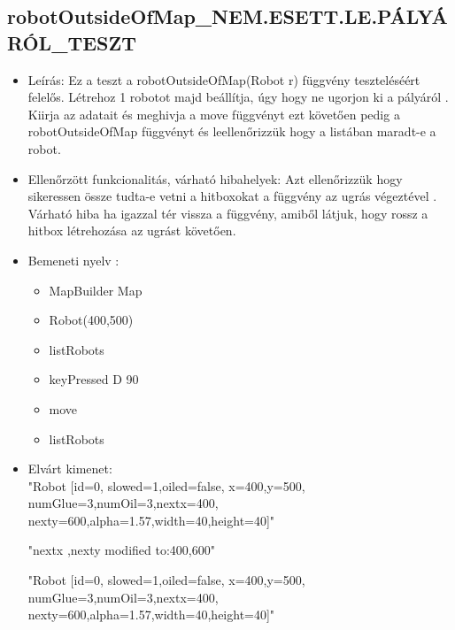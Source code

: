 \subsection{robotOutsideOfMap\_NEM.ESETT.LE.PÁLYÁRÓL\_TESZT}
\begin{itemize}
	\item Leírás: Ez a teszt a robotOutsideOfMap(Robot r) függvény teszteléséért felelős.
			Létrehoz 1 robotot majd beállítja, úgy hogy ne ugorjon ki a pályáról .
			Kiirja az adatait  és meghivja a move függvényt ezt követően pedig a robotOutsideOfMap függvényt és leellenőrizzük hogy a listában maradt-e             a robot.\newline
	\item Ellenőrzött funkcionalitás, várható hibahelyek: Azt ellenőrizzük hogy sikeressen össze tudta-e vetni a hitboxokat a függvény az ugrás                     végeztével .
	        Várható hiba ha igazzal tér vissza a függvény, amiből látjuk, hogy rossz a hitbox létrehozása  az ugrást követően.
	\item Bemeneti nyelv :
		\begin{itemize}
        \item MapBuilder Map
		\item Robot(400,500)
		\item listRobots
		\item keyPressed D 90
		\item move
		\item listRobots
		\end{itemize}

	\item Elvárt kimenet: \\
		"Robot [id=0,  slowed=1,oiled=false, x=400,y=500, 
		\\numGlue=3,numOil=3,nextx=400,
		\\nexty=600,alpha=1.57,width=40,height=40]"\newline
		
		"nextx ,nexty modified to:400,600"\newline

	
		 "Robot [id=0,  slowed=1,oiled=false, x=400,y=500, 
		\\numGlue=3,numOil=3,nextx=400,
		\\nexty=600,alpha=1.57,width=40,height=40]"\newline
	
\end{itemize}

\pagebreak
